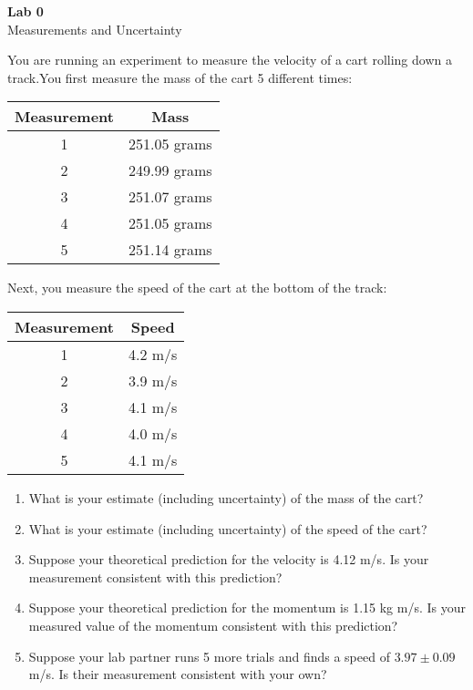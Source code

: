 \documentclass{article}
\begin{document}
\fancyfoot[C]{\thepage}
\vspace*{0cm}
\begin{center}
	{\LARGE \textbf{Lab 0}}\\
	\vspace{.25cm}
	{\Large Measurements and Uncertainty}
\end{center}

You are running an experiment to measure the velocity of a cart rolling down a track.You first measure the mass of the cart 5 different times:

\begin{center}
	\begin{tabular}{|c|c|}
		\hline
		Measurement & Mass \\
		\hline
		1 & 251.05 grams \\
		\hline
		2 & 249.99 grams \\
		\hline
		3 & 251.07 grams \\
		\hline
		4 & 251.05 grams \\
		\hline 
		5 & 251.14 grams \\
		\hline
	\end{tabular}
\end{center}

Next, you measure the speed of the cart at the bottom of the track:

\begin{center}
	\begin{tabular}{|c|c|}
		\hline
		Measurement & Speed \\
		\hline
		1 & 4.2 m/s \\
		\hline
		2 & 3.9 m/s \\
		\hline
		3 & 4.1 m/s\\
		\hline
		4 & 4.0 m/s\\
		\hline 
		5 & 4.1 m/s\\
		\hline
	\end{tabular}
\end{center}


\begin{enumerate}
	\item What is your estimate (including uncertainty) of the mass of the cart?
	\item What is your estimate (including uncertainty) of the speed of the cart?
	\item Suppose your theoretical prediction for the velocity is 4.12 m/s. Is your measurement consistent with this prediction?
	\item Suppose your theoretical prediction for the momentum is 1.15 kg m/s. Is your measured value of the momentum consistent with this prediction?
	\item Suppose your lab partner runs 5 more trials and finds a speed of $3.97\pm0.09$ m/s. Is their measurement consistent with your own?
\end{enumerate}
\end{document}
